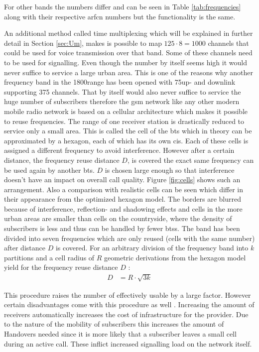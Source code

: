 For other bands the numbers differ and can be seen in Table \ref{tab:frequencies} along with their respective \gls{arfcn} numbers but the functionality is the same.

An additional method called time multiplexing which will be explained in further detail in Section \ref{sec:Um}, makes is possible to map $125 \cdot 8 = 1000$ channels that could be used for voice transmission over that band.
Some of these channels need to be used for signalling.
Even though the number by itself seems high it would never suffice to service a large urban area.
This is one of the reasons why another frequency band in the 1800\MHz range has been opened with 75\MHz up- and downlink supporting 375 channels.
That by itself would also never suffice to service the huge number of subscribers therefore the \gls{gsm} network like any other modern mobile radio network is based on a cellular architecture which makes it possible to reuse frequencies.
The range of one receiver station is drastically reduced to service only a small area.
This is called the cell of the \gls{bts} which in theory can be approximated by a hexagon, each of which has its own \glspl{ci}.
Each of these cells is assigned a different frequency to avoid interference.
However after a certain distance, the frequency reuse distance $D$, is covered the exact same frequency can be used again by another \gls{bts}.
$D$ is chosen large enough so that interference doesn't have an impact on overall call quality.
Figure \ref{fig:cells} shows such an arrangement.
Also a comparison with realistic cells can be seen which differ in their appearance from the optimized hexagon model.
The borders are blurred because of interference, reflection- and shadowing effects and cells in the more urban areas are smaller than cells on the countryside, where the density of subscribers is less and thus can be handled by fewer \glspl{bts}.
The band has been divided into seven frequencies which are only reused (cells with the same number) after distance $D$ is covered.
For an arbitrary division of the frequency band into $k$ partitions and a cell radius of $R$ geometric derivations from the hexagon model yield for the frequency reuse distance $D$ \cite{GSM2009}:
\begin{align}
D	&=R\cdot\sqrt{3k}
\end{align}

This procedure raises the number of effectively usable by a large factor.
However certain disadvantages come with this procedure as well \cite{protocols1999}.
Increasing the amount of receivers automatically increases the cost of infrastructure for the provider.
Due to the nature of the mobility of subscribers this increases the amount of Handovers needed since it is more likely that a subscriber leaves a small cell during an active call.
These inflict increased signalling load on the network itself.

